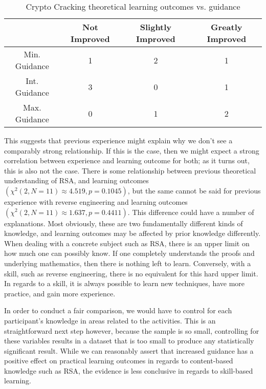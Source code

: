         \begin{table}
        \begin{center}
            \begin{tabular}{|c|c|c|c|}
                \hline
                    & Not Improved & Slightly Improved & Greatly Improved \\
                \hline
                Min. Guidance & 1 & 2 & 1\\
                \hline
                Int. Guidance & 3 & 0 & 1\\
                \hline
                Max. Guidance & 0 & 1 & 2\\
                \hline
            \end{tabular}

            \caption{Crypto Cracking theoretical learning outcomes vs. guidance}\label{tab:cc-tLO-v-g}
        \end{center}
        \end{table}

        This suggests that previous experience might explain why we don't see a comparably strong relationship. 
        If this is the case, then we might expect a strong correlation between experience and learning outcome for both; 
        as it turns out, this is also not the case. 
        There is some relationship between previous theoretical understanding of RSA, and learning outcomes $(\chi^2(2, N=11)\approx4.519,  p = 0.1045)$, but the same cannot be said for previous experience with reverse engineering and learning outcomes $(\chi^2(2, N=11)\approx1.637,  p = 0.4411)$. 
        This difference could have a number of explanations. 
        Most obviously, these are two fundamentally different kinds of knowledge, and learning outcomes may be affected by prior knowledge differently. 
        When dealing with a concrete subject such as RSA, there is an upper limit on how much one can possibly know. 
        If one completely understands the proofs and underlying mathematics, then there is nothing left to learn. 
        Conversely, with a skill, such as reverse engineering, there is no equivalent for this hard upper limit. 
        In regards to a skill, it is always possible to learn new techniques, have more practice, and gain more experience. 

        In order to conduct a fair comparison, we would have to control for each participant's knowledge in areas related to the activities. 
        This is an straightforward next step however, because the sample is so small, controlling for these variables results in a dataset that is too small to produce any statistically significant result. 
        While we can reasonably assert that increased guidance has a positive effect on practical learning outcomes in regards to content-based knowledge such as RSA, the evidence is less conclusive in regards to skill-based learning. 

